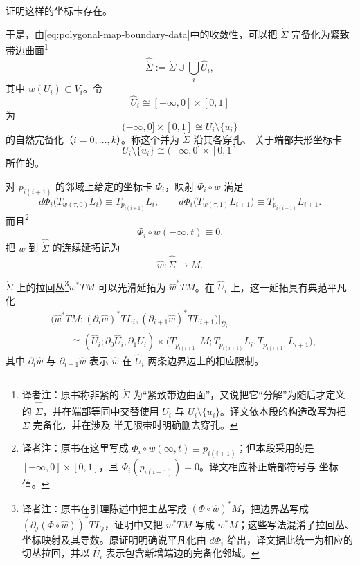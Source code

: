 \begin{exercise}
\label{ex:darboux-chart-transversal-pair}
证明这样的\personDarboux{}坐标卡存在。
\end{exercise}

于是，由\eqref{eq:polygonal-map-boundary-data}中的收敛性，可以把
$\dot\Sigma$ 完备化为紧致带边\personRiemann{}曲面\footnote{译者注：原书称非紧的
$\dot\Sigma$ 为“紧致带边\personRiemann{}曲面”，又说把它“分解”为随后才定义的
$\widehat{\dot\Sigma}$，并在端部等同中交替使用 $U_i$ 与
$U_i\setminus\{u_i\}$。译文依本段的构造改写为把 $\dot\Sigma$ 完备化，并在涉及
半无限带时明确删去穿孔。}
\[
  \widehat{\dot\Sigma}
  :=\dot\Sigma\cup\bigcup_i\widehat U_i,
\]
其中 $w(U_i)\subset V_i$。令
\[
  \widehat U_i\cong[-\infty,0]\times[0,1]
\]
为
\[
  (-\infty,0]\times[0,1]
  \cong U_i\setminus\{u_i\}
\]
的自然完备化（$i=0,\ldots,k$）。称这个并为 $\dot\Sigma$ 沿其各穿孔、
关于端部共形坐标卡
\[
  U_i\setminus\{u_i\}\cong(-\infty,0]\times[0,1]
\]
所作的\emph{\termRealBlowUp{}}。

对 $p_{i(i+1)}$ 的邻域上给定的\personDarboux{}坐标卡 $\Phi_i$，映射
$\Phi_i\circ w$ 满足
\begin{equation}
  d\Phi_i\bigl(T_{w(\tau,0)}L_i\bigr)
    \equiv T_{p_{i(i+1)}}L_i,
  \qquad
  d\Phi_i\bigl(T_{w(\tau,1)}L_{i+1}\bigr)
    \equiv T_{p_{i(i+1)}}L_{i+1}.
\label{eq:darboux-end-trivialization}
\end{equation}
而且\footnote{译者注：原书在这里写成
$\Phi_i\circ w(\infty,t)\equiv p_{i(i+1)}$；但本段采用的是
$[-\infty,0]\times[0,1]$，且 $\Phi_i(p_{i(i+1)})=0$。译文相应补正端部符号与
坐标值。}
\[
  \Phi_i\circ w(-\infty,t)\equiv0.
\]
把 $w$ 到 $\widehat{\dot\Sigma}$ 的连续延拓记为
\[
  \widehat w:\widehat{\dot\Sigma}\longrightarrow M.
\]

\begin{lemma}
\label{lem:polygonal-pullback-extension}
$\dot\Sigma$ 上的拉回丛\footnote{译者注：原书在引理陈述中把主丛写成
$(\Phi\circ\widehat w)^*M$，把边界丛写成
$(\partial_j(\Phi\circ\widehat w))^*TL_j$，证明中又把 $w^*TM$ 写成
$w^*M$；这些写法混淆了拉回丛、\personDarboux{}坐标映射及其导数。原证明明确说平凡化由
$d\Phi_i$ 给出，译文据此统一为相应的切丛拉回，并以
$\widehat U_i$ 表示包含新增端边的完备化邻域。}$w^*TM$ 可以光滑延拓为
$\widehat w^*TM$。在 $\widehat U_i$ 上，这一延拓具有典范平凡化
\[
\begin{aligned}
  &\bigl(\widehat w^*TM;
    (\partial_i\widehat w)^*TL_i,
    (\partial_{i+1}\widehat w)^*TL_{i+1}\bigr)
    \big|_{\widehat U_i}\\
  &\qquad\cong
  (\widehat U_i;\partial_0\widehat U_i,\partial_1\widehat U_i)
  \times
  \bigl(T_{p_{i(i+1)}}M;
    T_{p_{i(i+1)}}L_i,T_{p_{i(i+1)}}L_{i+1}\bigr),
\end{aligned}
\]
其中 $\partial_i\widehat w$ 与 $\partial_{i+1}\widehat w$ 表示
$\widehat w$ 在 $\widehat U_i$ 两条边界边上的相应限制。
\end{lemma}

